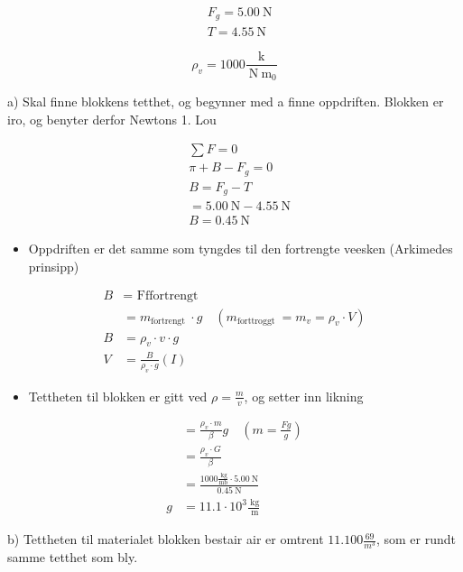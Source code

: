 \documentclass[10pt]{article}
\begin{document}
$$
\begin{aligned}
& F_{g}=5.00 \mathrm{~N} \\
& T=4.55 \mathrm{~N}
\end{aligned}
$$

$$
\rho_{v}=1000 \frac{\mathrm{k}}{\mathrm{~N} \mathrm{~m}_{0}}
$$

a) Skal finne blokkens tetthet, og begynner med a finne oppdriften. Blokken er iro, og benyter derfor Newtons 1. Lou

$$
\begin{aligned}
& \sum F=0 \\
& \pi+B-F_{g}=0 \\
& B=F_{g}-T \\
& =5.00 \mathrm{~N}-4.55 \mathrm{~N} \\
& B=0.45 \mathrm{~N}
\end{aligned}
$$

\begin{itemize}
  \item Oppdriften er det samme som tyngdes til den fortrengte veesken (Arkimedes prinsipp)
\end{itemize}


\begin{align*}
B & =\text { Fffortrengt } \\
& =m_{\text {fortrengt }} \cdot g \quad\left(m_{\text {forttroggt }}=m_{v}=\rho_{v} \cdot V\right) \\
B & =\rho_{v} \cdot v \cdot g \\
V & =\frac{B}{\rho_{v} \cdot g}(I) \tag{I}
\end{align*}


\begin{itemize}
  \item Tettheten til blokken er gitt ved $\rho=\frac{m}{v}$, og setter inn likning
\end{itemize}


\begin{align*}
& =\frac{\rho_{v} \cdot m}{\beta} g \quad\left(m=\frac{F g}{g}\right)  \tag{I}\\
& =\frac{\rho_{v} \cdot G}{\beta} \\
& =\frac{1000 \frac{\mathrm{~kg}}{\mathrm{mb}} \cdot 5.00 \mathrm{~N}}{0.45 \mathrm{~N}} \\
g & =11.1 \cdot 10^{3} \frac{\mathrm{~kg}}{\mathrm{~m}}
\end{align*}


b) Tettheten til materialet blokken bestair air er omtrent $11.100 \frac{69}{m^{3}}$, som er rundt samme tetthet som bly.\\
\end{document}
